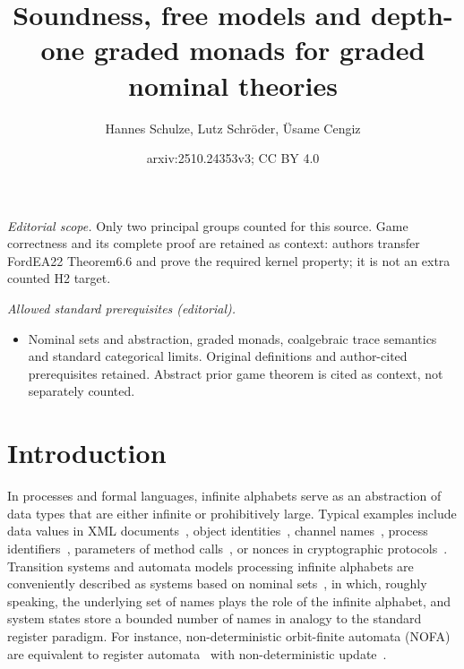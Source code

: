 \documentclass[11pt,a4paper]{amsart}
\title{Soundness, free models and depth-one graded monads for graded nominal theories}
\author{Hannes Schulze, Lutz Schröder, Üsame Cengiz}
\date{arxiv:2510.24353v3; CC BY 4.0}
\theoremstyle{plain}
\numberwithin{equation}{section}
\newcommand{\+}[1]{\mathcal{#1}\xspace}
\theoremstyle{definition}
\begin{document}
\maketitle
\noindent\textit{Editorial scope.} Only two principal groups counted for this source. Game correctness and its complete proof are retained as context: authors transfer FordEA22 Theorem6.6 and prove the required kernel property; it is not an extra counted H2 target.\par\medskip
\noindent\textit{Allowed standard prerequisites (editorial).}\begin{itemize}
\item Nominal sets and abstraction, graded monads, coalgebraic trace semantics and standard categorical limits. Original definitions and author-cited prerequisites retained. Abstract prior game theorem is cited as context, not separately counted.
\end{itemize}\medskip
\section{Introduction}\label{sec:intro}

In processes and formal languages, infinite alphabets serve as an
abstraction of data types that are either infinite or prohibitively
large. Typical examples include data values in XML
documents~\cite{NevenEA04}, object identities~\cite{GrigoreEA13},
channel names~\cite{Hennessy02}, process
identifiers~\cite{BolligEA14}, parameters of method
calls~\cite{HowarEA19}, or nonces in cryptographic
protocols~\cite{KurtzEA07}. Transition systems and automata models
processing infinite alphabets are conveniently described as systems
based on nominal sets~\cite{BojanczykEA14,ParrowEA21}, in which,
roughly speaking, the underlying set of names plays the role of the
infinite alphabet, and system states store a bounded number of names
in analogy to the standard register paradigm. For instance,
non-deterministic orbit-finite automata (NOFA)~\cite{BojanczykEA14}
are equivalent to register automata~\cite{KaminskiFrancez94} with
non-deterministic update~\cite{KaminskiZeitlin10}.
\end{document}
